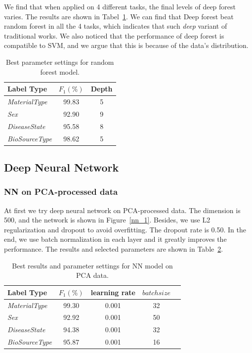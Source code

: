 \documentclass[sigconf]{acmart}
\begin{document}
We find that when applied on 4 different tasks, the final levels of deep forest varies. The results are shown in Tabel~\ref{tab:DeepForest}. We can find that Deep forest beat random forest in all the 4 tasks, which indicates that such \textit{deep} variant of traditional works. We also noticed that the performance of deep forest is compatible to SVM, and we argue that this is because of the data's distribution.
\begin{table}[tbp]
	\centering
	\begin{tabular}{l|cc}
		\toprule
		{Label Type} & $F_1 (\%)$&Depth\\
		\midrule
		{\textit{MaterialType}}&99.83 &5\\
		{\textit{Sex}}		& 92.90  &9\\
		{\textit{DiseaseState}}& 95.58 &8 \\
		{\textit{BioSourceType}}& 98.62 &5\\
		\bottomrule	
	\end{tabular}
	\caption{Best parameter settings for random forest model. }
	\label{tab:DeepForest}
\end{table}

\subsection{Deep Neural Network}

\subsubsection{ NN on PCA-processed data}
At first we try deep neural network on   PCA-processed data. The dimension is 500, and the network is shown in Figure~\ref{nn_1}. Besides,  we use L2 regularization and dropout to avoid overfitting. The dropout rate is 0.50. In the end, we use batch normalization in each layer and it greatly improves the performance. The results and selected parameters are shown in Table~\ref{nnpca_result}.
	
	\begin{table}[tbp]
		\centering
		\begin{tabular}{l|cccc}
			\toprule
			{Label Type} & $F_1 (\%)$ & learning rate &$batch size$  \\
			\midrule
			{\textit{MaterialType}}&99.30 & 0.001 &32\\
			{\textit{Sex}}		& 92.92 & 0.001    &50 \\
			{\textit{DiseaseState}}& 94.38 & 0.001 &32\\
			{\textit{BioSourceType}}& 95.87 & 0.001 &16\\
			\bottomrule	
		\end{tabular}
		
		\caption{Best results and parameter settings for NN model on PCA data. }
		\label{nnpca_result}
	\end{table}
	
\end{document}
